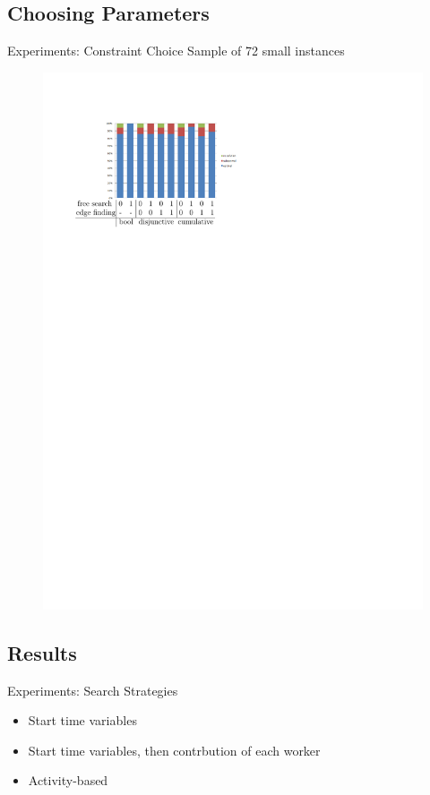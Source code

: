 \documentclass{beamer}
\begin{document}
\subsection{Choosing Parameters}
\begin{frame}{Experiments: Constraint Choice}
	Sample of 72 small instances\pause
	\begin{figure}[H]
		\includegraphics[width=0.8\linewidth]{images/constChoice.pdf}
	\end{figure}
\end{frame}

\subsection{Results}
\begin{frame}{Experiments: Search Strategies}
	\begin{itemize}
		\item \pause Start time variables
		\vspace{2mm}
		\item \pause Start time variables, then contrbution of each worker
		\vspace{2mm}
		\item \pause Activity-based
	\end{itemize}
\end{frame}
\end{document}

